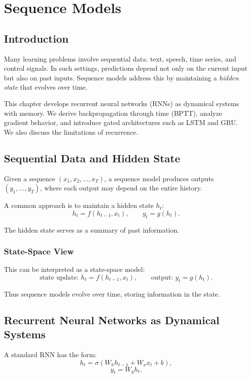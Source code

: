 \chapter{Sequence Models}

\section{Introduction}

Many learning problems involve sequential data: text, speech, time series, and control signals. In such settings, predictions depend not only on the current input but also on past inputs. Sequence models address this by maintaining a \emph{hidden state} that evolves over time.

This chapter develops recurrent neural networks (RNNs) as dynamical systems with memory. We derive backpropagation through time (BPTT), analyze gradient behavior, and introduce gated architectures such as LSTM and GRU. We also discuss the limitations of recurrence.

\section{Sequential Data and Hidden State}

Given a sequence $(x_1, x_2, \dots, x_T)$, a sequence model produces outputs $(y_1, \dots, y_T)$, where each output may depend on the entire history.

A common approach is to maintain a hidden state $h_t$:
\[
h_t = f(h_{t-1}, x_t), \qquad y_t = g(h_t).
\]

The hidden state serves as a summary of past information.

\subsection{State-Space View}

This can be interpreted as a state-space model:
\[
\text{state update: } h_t = f(h_{t-1}, x_t), \qquad
\text{output: } y_t = g(h_t).
\]

Thus sequence models evolve over time, storing information in the state.

\section{Recurrent Neural Networks as Dynamical Systems}

A standard RNN has the form:
\[
h_t = \sigma(W_h h_{t-1} + W_x x_t + b),
\]
\[
y_t = W_y h_t.
\]


